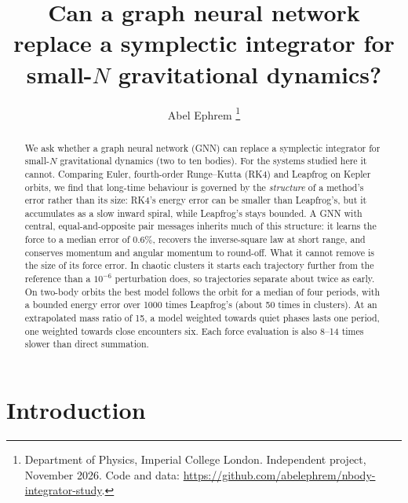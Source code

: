 \documentclass[a4paper,journal]{IEEEtran}
\begin{document}
\title{Can a graph neural network replace a symplectic integrator for small-$N$ gravitational dynamics?}

\author{Abel Ephrem%
\thanks{Department of Physics, Imperial College London. Independent project, November 2026. Code and data: \url{https://github.com/abelephrem/nbody-integrator-study}.}}


\maketitle

\begin{abstract}
We ask whether a graph neural network (GNN) can replace a symplectic integrator for small-$N$ gravitational dynamics (two to ten bodies). For the systems studied here it cannot. Comparing Euler, fourth-order Runge--Kutta (RK4) and Leapfrog on Kepler orbits, we find that long-time behaviour is governed by the \emph{structure} of a method's error rather than its size: RK4's energy error can be smaller than Leapfrog's, but it accumulates as a slow inward spiral, while Leapfrog's stays bounded. A GNN with central, equal-and-opposite pair messages inherits much of this structure: it learns the force to a median error of $0.6\%$, recovers the inverse-square law at short range, and conserves momentum and angular momentum to round-off. What it cannot remove is the size of its force error. In chaotic clusters it starts each trajectory further from the reference than a $10^{-6}$ perturbation does, so trajectories separate about twice as early. On two-body orbits the best model follows the orbit for a median of four periods, with a bounded energy error over 1000 times Leapfrog's (about 50 times in clusters). At an extrapolated mass ratio of 15, a model weighted towards quiet phases lasts one period, one weighted towards close encounters six. Each force evaluation is also 8--14 times slower than direct summation.
\end{abstract}


\section{Introduction}
\end{document}

